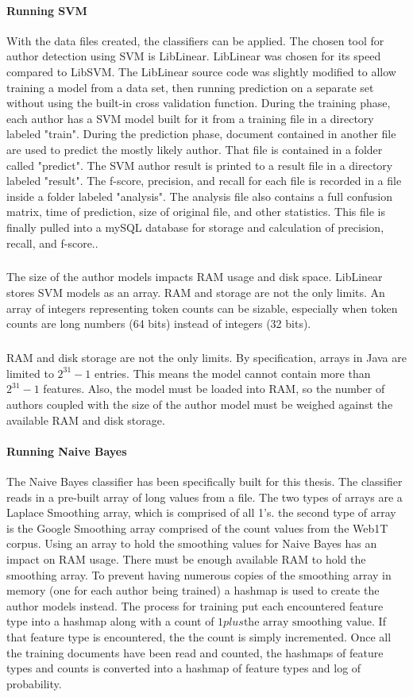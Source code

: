 	\paragraph{Running SVM} With the data files created, the classifiers can be applied. The chosen tool for author detection using SVM is LibLinear.  LibLinear was chosen for its speed compared to LibSVM.  The LibLinear source code was slightly modified to allow training a model from a data set, then running prediction on a separate set without using the built-in cross validation function.  During the training phase, each author has a SVM model built for it from a training file in a directory labeled "train".  During the prediction phase, document contained in another file are used to predict the mostly likely author.  That file is contained in a folder called "predict". The SVM author result is printed to a result file in a directory labeled "result".  The f-score, precision, and recall for each file is recorded in a file inside a folder labeled "analysis".  The analysis file also contains a full confusion matrix, time of prediction, size of original file, and other statistics.  This file is finally pulled into a mySQL database for storage and calculation of precision, recall, and f-score..
	\subparagraph{} The size of the author models impacts RAM usage and disk space.  LibLinear stores SVM models as an array. RAM and storage are not the only limits.  An array of integers representing token counts can be sizable, especially when token counts are long numbers (64 bits) instead of integers (32 bits). 
	\subparagraph{} RAM and disk storage are not the only limits. By specification, arrays in Java are limited to $2^{31}-1$ entries.  This means the model cannot contain more than $2^{31}-1$ features.  Also, the model must be loaded into RAM, so the number of authors coupled with the size of the author model must be weighed against the available RAM and disk storage.
	
	\paragraph{Running Naive Bayes} The Naive Bayes classifier has been specifically built for this thesis.  The classifier reads in a pre-built array of long values from a file.  The two types of arrays are a Laplace Smoothing array, which is comprised of all 1's.  the second type of array is the Google Smoothing array comprised of the count values from the Web1T corpus.  Using an array to hold the smoothing values for Naive Bayes has an impact on RAM usage.  There must be enough available RAM to hold the smoothing array.  To prevent having numerous copies of the smoothing array in memory (one for each author being trained) a hashmap is used to create the author models instead.  The process for training put each encountered feature type into a hashmap along with a count of $1 plus \text{the array smoothing value}$.  If that feature type is encountered, the the count is simply incremented. Once all the training documents have been read and counted, the hashmaps of feature types and counts is converted into a hashmap of feature types and log of probability.
